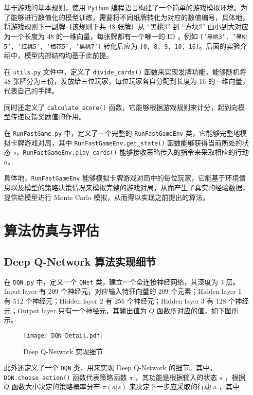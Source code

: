 基于游戏的基本规则，使用 \texttt{Python} 编程语言构建了一个简单的游戏模拟环境。为了能够进行数值化的模型训练，需要将不同纸牌转化为对应的数值编号，具体地，将游戏规则下一副牌（该规则下共 48 张牌）从 “黑桃3” 到 “方块2” 由小到大对应为一个长度为 48 的一维向量，每张牌都有一个唯一的 ID ，例如 \texttt{['黑桃3', '黑桃5', '红桃5', '梅花5', '黑桃7']} 转化后应为 \texttt{[0, 8, 9, 10, 16]}。后面的实验介绍中，模型内部结构均基于此前提。

在 \texttt{utils.py} 文件中，定义了 \texttt{divide\_cards()} 函数来实现发牌功能，能够随机将 48 张牌分为三份，发放给三位玩家，每位玩家各自分配到长度为 16 的一维向量，代表自己的手牌。

同时还定义了 \texttt{calculate\_score()} 函数，它能够根据游戏规则来计分，起到向模型传递反馈奖励值的作用。

在 \texttt{RunFastGame.py} 中，定义了一个完整的 \texttt{RunFastGameEnv} 类，它能够完整地模拟卡牌游戏对局，其中 \texttt{RunFastGameEnv.get\_state()} 函数能够获得当前所处的状态 $s$，\texttt{RunFastGameEnv.play\_cards()} 能够接收策略传入的指令来采取相应的行动 $a$。

具体地，\texttt{RunFastGameEnv} 能够模拟卡牌游戏对局中的每位玩家，它能基于环境信息以及模型的策略决策情况来模拟完整的游戏对局，从而产生了真实的经验数据，提供给模型进行 Monte Carlo 模拟，从而得以实现之前提出的算法。

\section{算法仿真与评估}

\subsection{Deep Q-Network 算法实现细节}

在 \texttt{DQN.py} 中，定义一个 \texttt{QNet} 类，建立一个全连接神经网络，其深度为 3 层。Input layer 有 209 个神经元，对应输入特征向量的 209 个元素；Hidden layer 1 有 512 个神经元；Hidden layer 2 有 256 个神经元；Hidden layer 3 有 128 个神经元；Output layer 只有一个神经元，其输出值为 $Q$ 函数所对应的值，如下图所示。

\begin{figure}[H]
    \centering
    \texttt{[image: DQN-Detail.pdf]}
    \caption{Deep Q-Network 实现细节}
\end{figure}

此外还定义了一个 \texttt{DQN} 类，用来实现 Deep Q-Network 的细节。其中，\texttt{DQN.choose\_action()} 函数代表策略函数 $\pi$ ，其功能是根据输入的状态 $s$ ，根据 $Q$ 函数大小决定的策略概率分布 $\pi(a|s)$ 来决定下一步应采取的行动 $a$ ，其中

